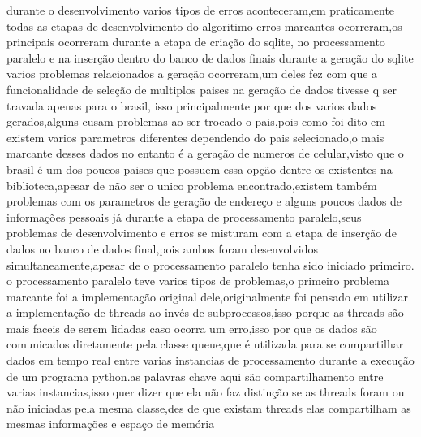 \documentclass[
	12pt,				%
	openright,			%
	oneside,			%
	a4paper,			%
	english,			%
	french,				%
	spanish,			%
	brazil,				%
	]{abntex2}
\begin{document}
durante o desenvolvimento varios tipos de erros aconteceram,em praticamente todas as etapas de desenvolvimento do algoritimo erros marcantes ocorreram,os principais ocorreram durante a etapa de criação do sqlite,
no processamento paralelo e na inserção dentro do banco de dados finais\newline
durante a geração do sqlite varios problemas relacionados a geração ocorreram,um deles fez com que a funcionalidade de seleção de multiplos paises na geração de dados tivesse q ser travada apenas para o brasil,
isso principalmente por que dos varios dados gerados,alguns cusam problemas ao ser trocado o pais,pois como foi dito em  existem varios parametros diferentes dependendo do pais selecionado,o mais marcante desses dados no entanto é a geração de numeros de celular,visto que o brasil é um dos poucos paises que possuem essa opção dentre os existentes na biblioteca,apesar de não ser o unico problema encontrado,existem também problemas com os parametros de geração de endereço e alguns poucos dados de informações pessoais\newline
já durante a etapa de processamento paralelo,seus problemas de desenvolvimento e erros se misturam com a etapa de inserção de dados no banco de dados final,pois ambos foram desenvolvidos simultaneamente,apesar de o processamento paralelo tenha sido iniciado primeiro.\newline
o processamento paralelo teve varios tipos de problemas,o primeiro problema marcante foi a implementação original dele,originalmente foi pensado em utilizar a implementação de threads ao invés de subprocessos,isso porque as threads são mais faceis de serem lidadas caso ocorra um erro,isso por que os dados são comunicados diretamente pela classe queue,que é utilizada para se compartilhar dados em tempo real entre varias instancias de processamento durante a execução de um programa python.as palavras chave aqui são compartilhamento entre varias instancias,isso quer dizer que ela não faz distinção se as threads foram ou não iniciadas pela mesma classe,des de que existam threads elas compartilham as mesmas informações e espaço de memória\newline
\end{document}
